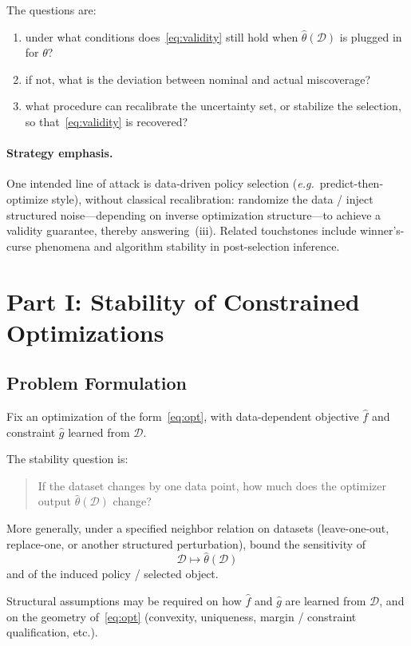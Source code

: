 \documentclass[12pt]{article}
\newcommand*{\eg}{\emph{e.g.}{}}
\theoremstyle{plain}
\begin{document}
The questions are:
\begin{enumerate}
\item[(i)] under what conditions does~\eqref{eq:validity} still hold when
\(\hat\theta(\mathcal{D})\) is plugged in for \(\theta\)?
\item[(ii)] if not, what is the deviation between nominal and actual
miscoverage?
\item[(iii)] what procedure can recalibrate the uncertainty set, or
stabilize the selection, so that~\eqref{eq:validity} is recovered?
\end{enumerate}

\paragraph{Strategy emphasis.}
One intended line of attack is data-driven policy selection
(\eg\ predict-then-optimize style), without classical recalibration:
randomize the data / inject structured noise---depending on inverse
optimization structure---to achieve a validity guarantee, thereby
answering~(iii).
Related touchstones include winner's-curse phenomena and algorithm
stability in post-selection inference.

\section{Part I: Stability of Constrained Optimizations}
\subsection{Problem Formulation}
Fix an optimization of the form~\eqref{eq:opt}, with data-dependent
objective \(\hat f\) and constraint \(\hat g\) learned from \(\mathcal{D}\).

The stability question is:
\begin{quote}
If the dataset changes by one data point, how much does the optimizer
output \(\hat\theta(\mathcal{D})\) change?
\end{quote}
More generally, under a specified neighbor relation on datasets
(leave-one-out, replace-one, or another structured perturbation),
bound the sensitivity of
\[
\mathcal{D}\mapsto\hat\theta(\mathcal{D})
\]
and of the induced policy / selected object.

Structural assumptions may be required on how \(\hat f\) and \(\hat g\)
are learned from \(\mathcal{D}\), and on the geometry of~\eqref{eq:opt}
(convexity, uniqueness, margin / constraint qualification, etc.).
\end{document}
